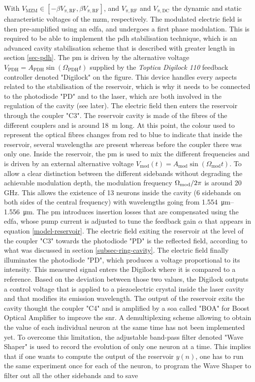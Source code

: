 With $V_{\text{MZM}} \in [-\beta V_{\pi,\text{RF}},\beta V_{\pi,\text{RF}}]$, and $V_{\pi,\text{RF}}$ and $V_{\pi,\text{DC}}$ the dynamic and static characteristic voltages of the \gls{mzm}, respectively. The modulated electric field is then pre-amplified using an \gls{edfa}, and undergoes a first phase modulation. This is required to be able to implement the \gls{pdh} stabilisation technique, which is an advanced cavity stabilisation scheme that is described with greater length in section \ref{sec-pdh}. The \gls{pm} is driven by the alternative voltage $V_{\text{PDH}} = A_{\text{PDH}} \sin{(\Omega_{\text{PDH}}t)}$ supplied by the \textit{Toptica Digilock 110} feedback controller denoted "Digilock" on the figure. This device handles every aspects related to the stabilisation of the reservoir, which is why it needs to be connected to the photodiode "PD" and to the laser, which are both involved in the regulation of the cavity (see later). The electric field then enters the reservoir through the coupler "C3". The reservoir cavity is made of the fibres of the different couplers and is around \SI{18}{m} long. At this point, the colour used to represent the optical fibres changes from red to blue to indicate that inside the reservoir, several wavelengths are present whereas before the coupler there was only one. Inside the reservoir, the \gls{pm} is used to mix the different frequencies and is driven by an external alternative voltage $V_{\text{mod}}(t) = A_{\text{mod}} \sin{ (\Omega_{\text{mod}} t)}$. To allow a clear distinction between the different sidebands without degrading the achievable modulation depth, the modulation frequency $\Omega_{\text{mod}}/2\pi$ is around 20 GHz. This allows the existence of 13 neurons inside the cavity (6 sidebands on both sides of the central frequency) with wavelengths going from \SIrange{1.554}{1.556}{\micro\metre}. The \gls{pm} introduces insertion losses that are compensated using the \gls{edfa}, whose pump current is adjusted to tune the feedback gain $\alpha$ that appears in equation \eqref{model-reservoir}. The electric field exiting the reservoir at the level of the coupler "C3" towards the photodiode "PD" is the reflected field, according to what was discussed in section \ref{subsec-ring-cavity}. The electric field finally illuminates the photodiode "PD", which produces a voltage proportional to its intensity. This measured signal enters the Digilock where it is compared to a reference. Based on the deviation between those two values, the Digilock outputs a control voltage that is applied to a piezoelectric crystal inside the laser cavity and that modifies its emission wavelength. The output of the reservoir exits the cavity thought the coupler "C4" and is amplified by a \gls{soa} called "BOA" for Boost Optical Amplifier to improve the \gls{snr}. A demultiplexing scheme allowing to obtain the value of each individual neuron at the same time has not been implemented yet. To overcome this limitation, the adjustable band-pass filter denoted "Wave Shaper" is used to record the evolution of only one neuron at a time. This implies that if one wants to compute the output of the reservoir $y(n)$, one has to run the same experiment once for each of the neuron, to program the Wave Shaper to filter out all the other sidebands and to save 